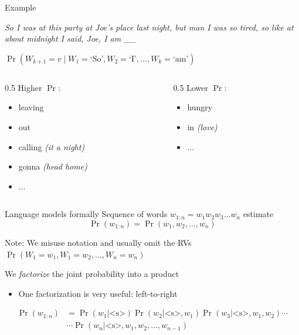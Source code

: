 \documentclass[12pt,aspectratio=169,handout]{beamer}
\begin{document}
\begin{frame}{Example}

\emph{So I was at this party at Joe's place last night, but man I was so tired, so like at about midnight I said, Joe, I am \_\_}

$\Pr(W_{k+1} = v \mid W_1 = \text{`So'}, W_2 = \text{`I'}, \ldots, W_k = \text{`am'})$

\medskip

\begin{columns}[t]
\begin{column}{0.5\linewidth}
Higher $\Pr$:
\begin{itemize}
\item leaving
\item out
\item calling \emph{(it a night)}
\item gonna \emph{(head home)}
\item $\ldots$
\end{itemize}
\end{column}
\begin{column}{0.5\linewidth}
Lower $\Pr$:
\begin{itemize}
\item hungry
\item in \emph{(love)}
\item $\ldots$
\end{itemize}
\end{column}

\end{columns}

\end{frame}


\begin{frame}{Language models formally}
	Sequence of words $w_{1:n} = w_1 w_2 w_3 \ldots w_n$ estimate
	$$
	\Pr(w_{1:n}) = \Pr(w_1, w_2, \ldots, w_n)
	$$
	\begin{block}{Note: We misuse notation and usually omit the RVs}
		$\Pr(W_1 = w_1, W_1 = w_2, \ldots, W_n = w_n)$
	\end{block}
	
	We \emph{factorize} the joint probability into a product
	\begin{itemize}
		\item One factorization is very useful: left-to-right
	\end{itemize}
	$$
	\begin{aligned}
	\Pr(w_{1:n}) &= \Pr(w_1 | \text{<s>}) \Pr (w_2 | \text{<s>}, w_1) \Pr(w_3 | \text{<s>}, w_1, w_2) \cdots\\
	&\cdots \Pr(w_n | \text{<s>}, w_1, w_2, \ldots, w_{n-1})
	\end{aligned}
	$$
	
\end{frame}
\end{document}
